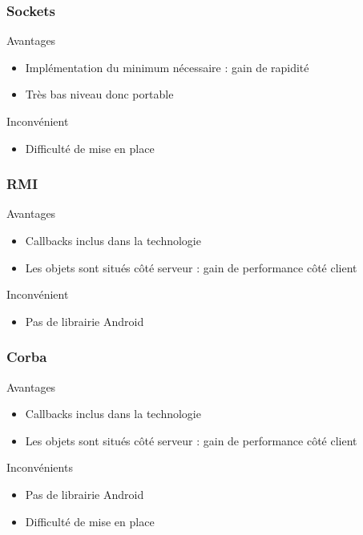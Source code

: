 \begin{frame}[c]
	\frametitle{Sockets}
	\begin{block}{Avantages}
		\begin{itemize}
			\item Implémentation du minimum nécessaire : gain de rapidité
			\item Très bas niveau donc portable
		\end{itemize}
	\end{block}
	\begin{block}{Inconvénient}
		\begin{itemize}
			\item Difficulté de mise en place
		\end{itemize}
	\end{block}
\end{frame}

\begin{frame}[c]
	\frametitle{RMI}
	\begin{block}{Avantages}
		\begin{itemize}
			\item Callbacks inclus dans la technologie 
			\item Les objets sont situés côté serveur : gain de performance côté client
		\end{itemize}
	\end{block}
	\begin{block}{Inconvénient}
		\begin{itemize}
			\item Pas de librairie Android
		\end{itemize}
	\end{block}
\end{frame}

\begin{frame}[c]
	\frametitle{Corba}
	\begin{block}{Avantages}
		\begin{itemize}
			\item Callbacks inclus dans la technologie 
			\item Les objets sont situés côté serveur : gain de performance côté client
		\end{itemize}
	\end{block}
	\begin{block}{Inconvénients}
		\begin{itemize}
			\item Pas de librairie Android
			\item Difficulté de mise en place
		\end{itemize}
	\end{block}
\end{frame}

